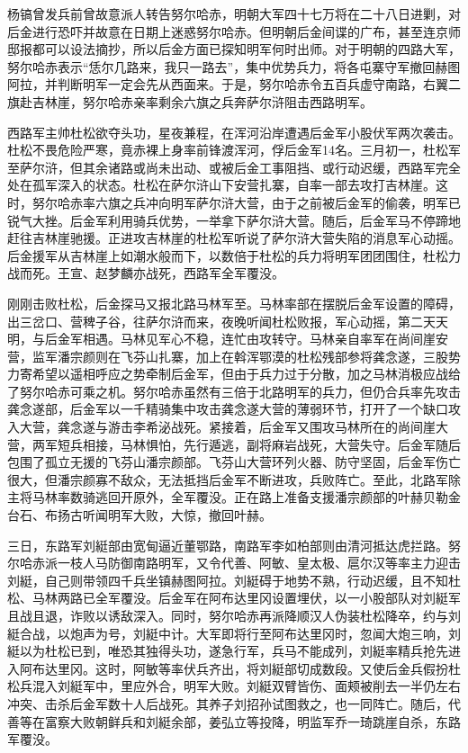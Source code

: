 杨镐曾发兵前曾故意派人转告努尔哈赤，明朝大军四十七万将在二十八日进剿，对后金进行恐吓并故意在日期上迷惑努尔哈赤。但明朝后金间谍的广布，甚至连京师邸报都可以设法摘抄，所以后金方面已探知明军何时出师。对于明朝的四路大军，努尔哈赤表示“恁尔几路来，我只一路去”，集中优势兵力，将各屯寨守军撤回赫图阿拉，并判断明军一定会先从西面来。于是，努尔哈赤令五百兵虚守南路，右翼二旗赴吉林崖，努尔哈赤亲率剩余六旗之兵奔萨尔浒阻击西路明军。

西路军主帅杜松欲夺头功，星夜兼程，在浑河沿岸遭遇后金军小股伏军两次袭击。杜松不畏危险严寒，竟赤裸上身率前锋渡浑河，俘后金军14名。三月初一，杜松军至萨尔浒，但其余诸路或尚未出动、或被后金工事阻挡、或行动迟缓，西路军完全处在孤军深入的状态。杜松在萨尔浒山下安营扎寨，自率一部去攻打吉林崖。这时，努尔哈赤率六旗之兵冲向明军萨尔浒大营，由于之前被后金军的偷袭，明军已锐气大挫。后金军利用骑兵优势，一举拿下萨尔浒大营。随后，后金军马不停蹄地赶往吉林崖驰援。正进攻吉林崖的杜松军听说了萨尔浒大营失陷的消息军心动摇。后金援军从吉林崖上如潮水般而下，以数倍于杜松的兵力将明军团团围住，杜松力战而死。王宣、赵梦麟亦战死，西路军全军覆没。

刚刚击败杜松，后金探马又报北路马林军至。马林率部在摆脱后金军设置的障碍，出三岔口、营稗子谷，往萨尔浒而来，夜晚听闻杜松败报，军心动摇，第二天天明，与后金军相遇。马林见军心不稳，连忙由攻转守。马林亲自率军在尚间崖安营，监军潘宗颜则在飞芬山扎寨，加上在斡浑鄂漠的杜松残部参将龚念遂，三股势力寄希望以遥相呼应之势牵制后金军，但由于兵力过于分散，加之马林消极应战给了努尔哈赤可乘之机。努尔哈赤虽然有三倍于北路明军的兵力，但仍合兵率先攻击龚念遂部，后金军以一千精骑集中攻击龚念遂大营的薄弱环节，打开了一个缺口攻入大营，龚念遂与游击李希泌战死。紧接着，后金军又围攻马林所在的尚间崖大营，两军短兵相接，马林惧怕，先行遁逃，副将麻岩战死，大营失守。后金军随后包围了孤立无援的飞芬山潘宗颜部。飞芬山大营环列火器、防守坚固，后金军伤亡很大，但潘宗颜寡不敌众，无法抵挡后金军不断进攻，兵败阵亡。至此，北路军除主将马林率数骑逃回开原外，全军覆没。正在路上准备支援潘宗颜部的叶赫贝勒金台石、布扬古听闻明军大败，大惊，撤回叶赫。

三日，东路军刘綎部由宽甸逼近董鄂路，南路军李如柏部则由清河抵达虎拦路。努尔哈赤派一枝人马防御南路明军，又令代善、阿敏、皇太极、扈尔汉等率主力迎击刘綎，自己则带领四千兵坐镇赫图阿拉。刘綎碍于地势不熟，行动迟缓，且不知杜松、马林两路已全军覆没。后金军在阿布达里冈设置埋伏，以一小股部队对刘綎军且战且退，诈败以诱敌深入。同时，努尔哈赤再派降顺汉人伪装杜松降卒，约与刘綎合战，以炮声为号，刘綎中计。大军即将行至阿布达里冈时，忽闻大炮三响，刘綎以为杜松已到，唯恐其独得头功，遂急行军，兵马不能成列，刘綎率精兵抢先进入阿布达里冈。这时，阿敏等率伏兵齐出，将刘綎部切成数段。又使后金兵假扮杜松兵混入刘綎军中，里应外合，明军大败。刘綎双臂皆伤、面颊被削去一半仍左右冲突、击杀后金军数十人后战死。其养子刘招孙试图救之，也一同阵亡。随后，代善等在富察大败朝鲜兵和刘綎余部，姜弘立等投降，明监军乔一琦跳崖自杀，东路军覆没。

